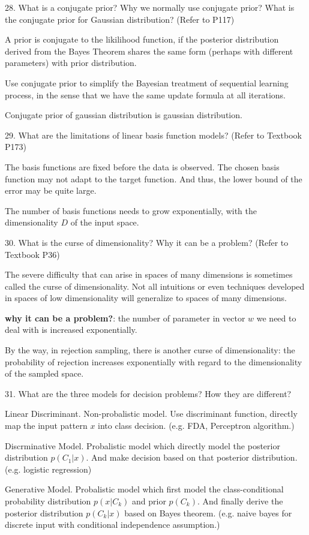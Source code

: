 \documentclass[11pt,a4paper]{article}
\newcommand{\BOLD}[1]{\textbf{#1}}
\begin{document}
28. What is a conjugate prior? Why we normally use conjugate prior? What is the conjugate prior for Gaussian distribution? (Refer to P117)

A prior is conjugate to the likilihood function, if the posterior distribution derived from the Bayes Theorem shares the same form (perhaps with different parameters) with prior distribution. 

    Use conjugate prior to simplify the Bayesian treatment of sequential learning process, in the sense that we have the same update formula at all iterations. 

    Conjugate prior of gaussian distribution is gaussian distribution.

29. What are the limitations of linear basis function models? (Refer to Textbook P173)

    The basis functions are fixed before the data is observed. The chosen basis function may not adapt to the target function. And thus, the lower bound of the error may be quite large.

    The number of basis functions needs to grow exponentially, with the dimensionality $D$ of the input space. 

30. What is the curse of dimensionality? Why it can be a problem? (Refer to Textbook P36)

The severe difficulty that can arise in spaces of many dimensions is sometimes called the curse of dimensionality. 
Not all intuitions or even techniques developed in spaces of low dimensionality will generalize to spaces of many dimensions.
    

\BOLD{why it can be a problem?}: the number of parameter in vector $w$ we need to deal with is increased exponentially. 

By the way, in rejection sampling, there is another curse of dimensionality: the probability of rejection increases exponentially with regard to the dimensionality of the sampled space.

31. What are the three models for decision problems? How they are different?
    
    Linear Discriminant. Non-probalistic model. Use discriminant function, directly map the input pattern $x$ into class decision. (e.g. FDA, Perceptron algorithm.)

    Discrminative Model. Probalistic model which directly model the posterior distribution $p(C_1|x)$. And make decision based on that posterior distribution. (e.g. logistic regression)

    Generative Model. Probalistic model which first model the class-conditional probability distribution $p(x|C_k)$ and prior $p(C_k)$. And finally derive the posterior distribution $p(C_k|x)$ based on Bayes theorem. (e.g. naive bayes for discrete input with conditional independence assumption.)
    
\end{document}
